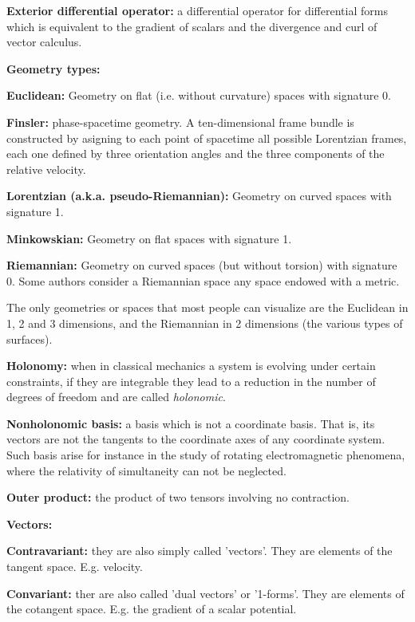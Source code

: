\begin{list}{}{}
	\item \textbf{Exterior differential operator:} a differential operator for differential forms which is equivalent to the gradient of scalars and the divergence and curl of vector calculus.
	
	\item \textbf{Geometry types:}
	\begin{list}{}{}
		\item \textbf{Euclidean:} Geometry on flat (i.e. without curvature) spaces with signature 0.
		
		\item \textbf{Finsler:} phase-spacetime geometry. A ten-dimensional frame bundle is constructed by asigning to each point of spacetime all possible Lorentzian frames, each one defined by three orientation angles and the three components of the relative velocity.
		
		\item \textbf{Lorentzian (a.k.a. pseudo-Riemannian):} Geometry on curved spaces with signature 1.
		
		\item \textbf{Minkowskian:} Geometry on flat spaces with signature 1.
		
		\item \textbf{Riemannian:} Geometry on curved spaces (but without torsion) with signature 0. Some authors consider a Riemannian space any space endowed with a metric.
		
		The only geometries or spaces that most people can visualize are the Euclidean in 1, 2 and 3 dimensions, and the Riemannian in 2 dimensions (the various types of surfaces).
	\end{list}
	
	\item \textbf{Holonomy:} when in classical mechanics a system is evolving under certain constraints, if they are integrable they lead to a reduction in the number of degrees of freedom and are called \emph{holonomic}.

	\item \textbf{Nonholonomic basis:} a basis which is not a coordinate basis. That is, its vectors are not the tangents to the coordinate axes of any coordinate system. Such basis arise for instance in the study of rotating electromagnetic phenomena, where the relativity of simultaneity can not be neglected.
	
	\item \textbf{Outer product:} the product of two tensors involving no contraction.
	
	\item \textbf{Vectors:}
		\begin{list}{}{}
		\item \textbf{Contravariant:} they are also simply called 'vectors'. They are elements of the tangent space. E.g. velocity.
		\item \textbf{Convariant:} ther are also called 'dual vectors' or '1-forms'. They are elements of the cotangent space. E.g. the gradient of a scalar potential.
		\end{list}
\end{list}



